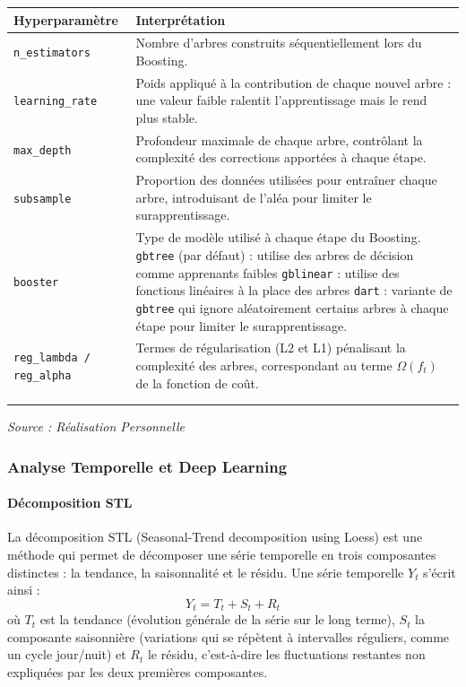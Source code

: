 \documentclass[a4paper,12pt, oneside]{article}
\begin{document}
\begin{longtable}{|m{5cm}|m{12cm}|}
\hline
\textbf{Hyperparamètre} & \textbf{Interprétation} \\
\hline
\texttt{n\_estimators} & Nombre d'arbres construits séquentiellement lors du Boosting. \\
\hline
\texttt{learning\_rate} & Poids appliqué à la contribution de chaque nouvel arbre : une valeur faible ralentit l'apprentissage mais le rend plus stable. \\
\hline
\texttt{max\_depth} & Profondeur maximale de chaque arbre, contrôlant la complexité des corrections apportées à chaque étape. \\
\hline
\texttt{subsample} & Proportion des données utilisées pour entraîner chaque arbre, introduisant de l'aléa pour limiter le surapprentissage. \\
\hline
\texttt{booster} & Type de modèle utilisé à chaque étape du Boosting. \newline\texttt{gbtree} (par défaut) : utilise des arbres de décision comme apprenants faibles \newline \texttt{gblinear} : utilise des fonctions linéaires à la place des arbres \newline \texttt{dart} : variante de \texttt{gbtree} qui ignore aléatoirement certains arbres à chaque étape pour limiter le surapprentissage. \\
\hline
\texttt{reg\_lambda / reg\_alpha} & Termes de régularisation (L2 et L1) pénalisant la complexité des arbres, correspondant au terme $\Omega(f_t)$ de la fonction de coût. \\
\hline
\caption{Hyperparamètres -- XGBoost\\}
\end{longtable}
\begin{center}
\vspace{-0.85cm}
\textit{Source : Réalisation Personnelle}
\end{center}

\subsubsection{Analyse Temporelle et Deep Learning}
\paragraph{Décomposition STL\\}
La décomposition STL (Seasonal-Trend decomposition using Loess) est une méthode qui permet de décomposer une série temporelle en trois composantes distinctes : la tendance, la saisonnalité et le résidu. Une série temporelle $Y_t$ s'écrit ainsi :
\[
Y_t = T_t + S_t + R_t
\]
où $T_t$ est la tendance (évolution générale de la série sur le long terme), $S_t$ la composante saisonnière (variations qui se répètent à intervalles réguliers, comme un cycle jour/nuit) et $R_t$ le résidu, c'est-à-dire les fluctuations restantes non expliquées par les deux premières composantes.
\end{document}
